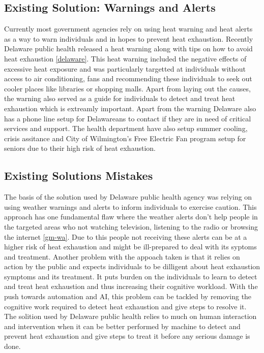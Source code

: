 \documentclass{article}
\begin{document}
\subsection{Existing Solution: Warnings and Alerts}
Currently most government agencies rely on using heat warning and heat alerts as a way to warn individuals and in hopes to prevent heat exhaustion. Recently Delaware public health released a heat warning along with tips on how to avoid heat exhaustion \ref{delaware}. This heat warning included the negative effects of excessive heat exposure and was particularly targetted at individuals without access to air conditioning, fans and recommending these individuals to seek out cooler places like libraries or shopping malls. Apart from laying out the causes, the warning also served as a guide for individuals to detect and treat heat exhaustion which is extreamly important. Apart from the warning Delaware also has a phone line setup for Delawareans to contact if they are in need of critical services and support. The health department have also setup summer cooling, crisis assitance and City of Wilmington's Free Electric Fan program setup for seniors due to their high risk of heat exhaustion.

\subsection{Existing Solutions Mistakes}
The basis of the solution used by Delaware public health agency was relying on using weather warnings and alerts to inform individuals to exercise caution. This approach has one fundamental flaw where the weather alerts don't help people in the targeted areas who not watching television, listening to the radio or browsing the internet \ref{gm-wa}. Due to this people not receiving these alerts can be at a higher risk of heat exhaustion and might be ill-prepared to deal with its syptoms and treatment. Another problem with the appoach taken is that it relies on action by the public and expects individuals to be dilligent about heat exhaustion symptoms and its treatment. It puts burden on the individuals to learn to detect and treat heat exhaustion and thus increasing their cognitive workload. With the push towards automation and AI, this problem can be tackled by removing the cognitive work required to detect heat exhaustion and give steps to resolve it. The solition used by Delaware public health relies to much on human interaction and intervention when it can be better performed by machine to detect and prevent heat exhaustion and give steps to treat it before any serious damage is done.
\end{document}
